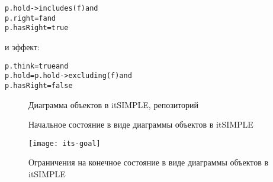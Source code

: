 \begin{alltt}
    p.hold->includes(f) and
    p.right = f and
    p.hasRight = true
\end{alltt}

\noindent и эффект:

\begin{alltt}
    p.think = true and
    p.hold = p.hold->excluding(f) and
    p.hasRight = false
\end{alltt}

\begin{figure}[h] 
    \caption{Диаграмма объектов в itSIMPLE, репозиторий}
    \label{img:its-repo}
\end{figure}

\begin{figure}[h] 
    \caption{Начальное состояние в виде диаграммы объектов в itSIMPLE}
    \label{img:its-init}
\end{figure}

\begin{figure}[h]
    \centering 
    \begin{minipage}{0.8\linewidth}
        \centering
        \texttt{[image: its-goal]}
        \caption{Ограничения на конечное состояние в виде диаграммы объектов в itSIMPLE}
        \label{img:its-goal}
    \end{minipage}
\end{figure}



